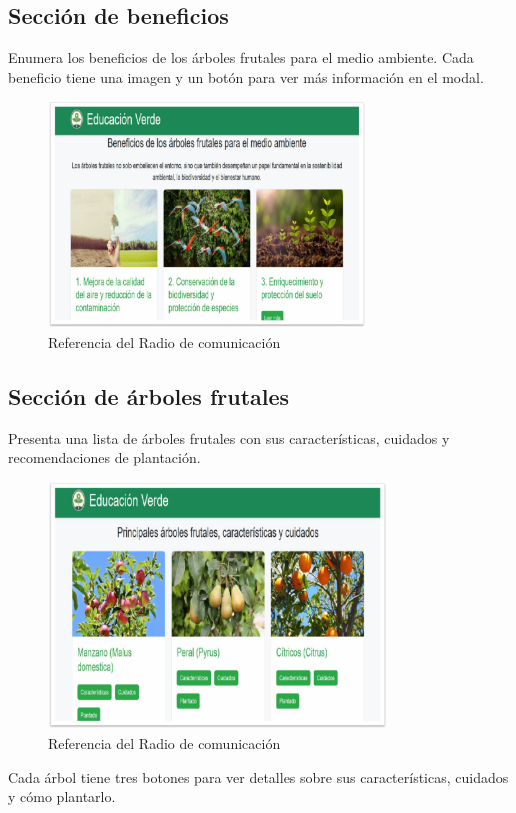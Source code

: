 \documentclass[11pt, a4paper, oneside]{book}
\begin{document}
\subsection { Sección de beneficios}
Enumera los beneficios de los árboles frutales para el medio ambiente.
Cada beneficio tiene una imagen y un botón para ver más información en el modal.
\begin{figure}[H]
\centering
\includegraphics[width=0.75\textwidth]{Pictures/beneficios.png}
\caption{Referencia del Radio de comunicación}
\end{figure}
\subsection {Sección de árboles frutales}
Presenta una lista de árboles frutales con sus características, cuidados y recomendaciones de plantación.
\begin{figure}[H]
\centering
\includegraphics[width=0.8\textwidth]{Pictures/arboles.png}
\caption{Referencia del Radio de comunicación}
\end{figure}

Cada árbol tiene tres botones para ver detalles sobre sus características, cuidados y cómo plantarlo.
\end{document}

